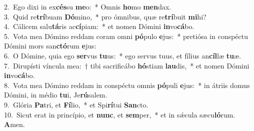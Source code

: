 {2.~}Ego dixi in ex\textbf{cés}su \textbf{me}o:~* Omnis \textbf{ho}mo \textbf{men}dax.\\
{3.~}Quid re\textbf{trí}buam \textbf{Dó}mino,~* pro ómnibus, quæ re\textbf{trí}buit \textbf{mi}hi?\\
{4.~}Cálicem salu\textbf{tá}ris ac\textbf{cí}piam:~* et nomen Dómini \textbf{in}vo\textbf{cá}bo.\\
{5.~}Vota mea Dómino reddam coram omni \textbf{pó}pulo \textbf{e}jus:~* pretiósa in conspéctu Dómini mors san\textbf{ctó}rum \textbf{e}jus:\\
{6.~}O Dómine, quia ego \textbf{ser}vus \textbf{tu}us:~* ego servus tuus, et fílius an\textbf{cíl}læ \textbf{tu}æ.\\
{7.~}Dirupísti víncula mea:~† tibi sacrificábo \textbf{hó}stiam \textbf{lau}dis,~* et nomen Dómini \textbf{in}vo\textbf{cá}bo.\\
{8.~}Vota mea Dómino reddam in conspéctu omnis \textbf{pó}puli \textbf{e}jus:~* in átriis domus Dómini, in médio \textbf{tu}i, Je\textbf{rú}salem.\\
{9.~}Glória \textbf{Pa}tri, et \textbf{Fí}lio,~* et Spi\textbf{rí}tui \textbf{San}cto.\\
{10.~}Sicut erat in princípio, et \textbf{nunc}, et \textbf{sem}per,~* et in sǽcula sæcu\textbf{ló}rum. \textbf{A}men.\\
